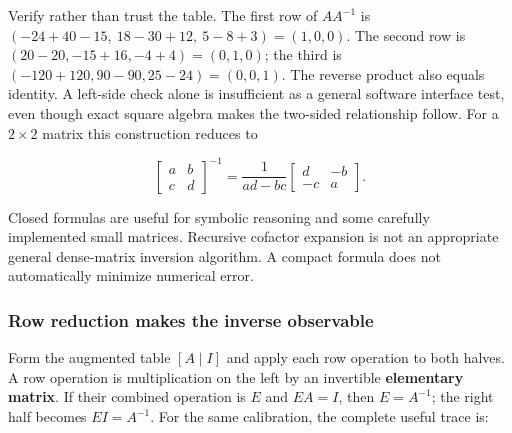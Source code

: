 Verify rather than trust the table. The first row of \(AA^{-1}\) is \((-24+40-15,\ 18-30+12,\ 5-8+3)=(1,0,0)\). The second row is \((20-20,-15+16,-4+4)=(0,1,0)\); the third is \((-120+120,90-90,25-24)=(0,0,1)\). The reverse product also equals identity. A left-side check alone is insufficient as a general software interface test, even though exact square algebra makes the two-sided relationship follow. For a \(2\times2\) matrix this construction reduces to

\[
\begin{bmatrix}a&b\\c&d\end{bmatrix}^{-1}
=\frac1{ad-bc}\begin{bmatrix}d&-b\\-c&a\end{bmatrix}.
\]

Closed formulas are useful for symbolic reasoning and some carefully implemented small matrices. Recursive cofactor expansion is not an appropriate general dense-matrix inversion algorithm. A compact formula does not automatically minimize numerical error.

\subsubsection{Row reduction makes the inverse observable}\label{01-foundations-i-ch018-row-reduction-makes-the-inverse-observable}

\hypertarget{01-foundations-i-ch018-row-reduction-makes-the-inverse-observable}{}

Form the augmented table \([A\mid I]\) and apply each row operation to both halves. A row operation is multiplication on the left by an invertible \textbf{elementary matrix}. If their combined operation is \(E\) and \(EA=I\), then \(E=A^{-1}\); the right half becomes \(EI=A^{-1}\). For the same calibration, the complete useful trace is:

